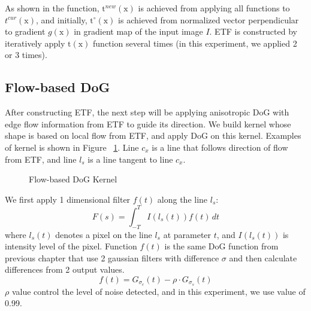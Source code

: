 As shown in the function, $\mbox{t}^{new}(\mbox{x})$ is achieved from applying all functions to $t^{cur}(\mbox{x})$, and initially, $\mbox{t}^{\circ}(\mbox{x})$ is achieved from normalized vector perpendicular to gradient $g(\mbox{x})$ in gradient map of the input image $I$. ETF is constructed by iteratively apply $\mbox{t}(\mbox{x})$ function several times (in this experiment, we applied 2 or 3 times).


\subsection{Flow-based DoG}
After constructing ETF, the next step will be applying anisotropic DoG with edge flow information from ETF to guide its direction. We build kernel whose shape is based on local flow from ETF, and apply DoG on this kernel. Examples of kernel is shown in Figure ~\ref{fig:FDoG_kernel}. Line $c_{x}$ is a line that follows direction of flow from ETF, and line $l_{s}$ is a line tangent to line $c_{x}$. 
\begin{figure}[H]
	\centering
	\caption{Flow-based DoG Kernel}\label{fig:FDoG_kernel}
\end{figure}

We first apply 1 dimensional filter $f(t)$ along the line $l_{s}$:
\begin{equation}
	F(s) = \int_{-T}^{T} I(l_s(t))f(t)\,dt
\end{equation}
where $l_s(t)$ denotes a pixel on the line $l_s$ at parameter $t$, and $I(l_s(t))$ is intensity level of the pixel. Function $f(t)$ is the same DoG function from previous chapter that use 2 gaussian filters with difference $\sigma$ and then calculate differences from 2 output values. 
\begin{equation}
	f(t) = G_{\sigma_{c}}(t)-\rho \cdot G_{\sigma_{s}}(t)
\end{equation}
$\rho$ value control the level of noise detected, and in this experiment, we use value of 0.99.

